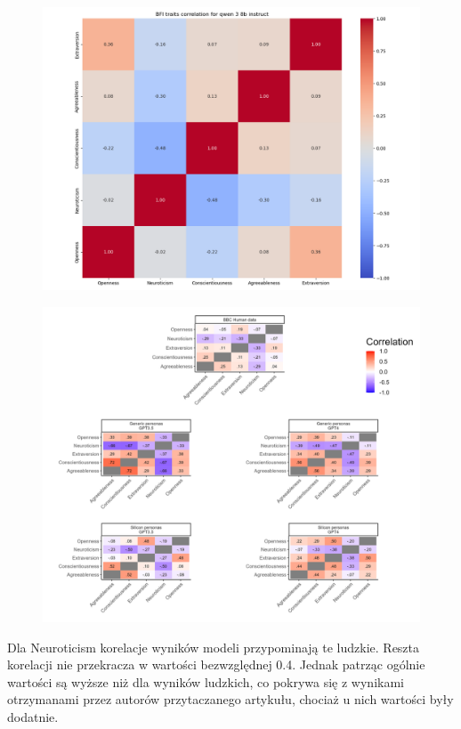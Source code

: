\documentclass{article}
\begin{document}
\begin{figure}[H]
    \centering
    \includegraphics[width=0.7 \linewidth]{../Prompt_code/plots/qwen-3-8b-instruct/bfi_correlation.png}
\end{figure}

\begin{figure}[H]
    \centering
    \includegraphics[width=0.7 \linewidth]{./article_data/all_corr.png}
\end{figure}

Dla Neuroticism korelacje wyników modeli przypominają te ludzkie. Reszta korelacji nie przekracza w wartości bezwzględnej 0.4. Jednak patrząc ogólnie wartości są wyższe niż dla wyników ludzkich, co pokrywa się z wynikami otrzymanami przez autorów przytaczanego artykułu, chociaż u nich wartości były dodatnie.
\end{document}
